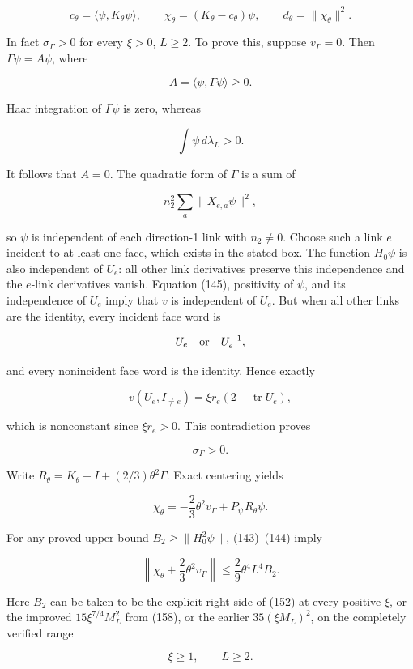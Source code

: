 \documentclass[
  11pt,
]{article}
\begin{document}
\[
 c_\theta=\langle\psi,K_\theta\psi\rangle,\qquad
 \chi_\theta=(K_\theta-c_\theta)\psi,
 \qquad d_\theta=\|\chi_\theta\|^2.
\]

In fact \(\sigma_\Gamma>0\) for every \(\xi>0\), \(L\ge2\). To prove
this, suppose \(v_\Gamma=0\). Then \(\Gamma\psi=A\psi\), where

\[
 A=\langle\psi,\Gamma\psi\rangle\ge0.
\]

Haar integration of \(\Gamma\psi\) is zero, whereas

\[
 \int\psi\,d\lambda_L>0.
\]

It follows that \(A=0\). The quadratic form of \(\Gamma\) is a sum of

\[
 n_2^2\sum_a\|X_{e,a}\psi\|^2,
\]

so \(\psi\) is independent of each direction-1 link with \(n_2\ne0\).
Choose such a link \(e\) incident to at least one face, which exists in
the stated box. The function \(H_0\psi\) is also independent of \(U_e\):
all other link derivatives preserve this independence and the \(e\)-link
derivatives vanish. Equation (145), positivity of \(\psi\), and its
independence of \(U_e\) imply that \(v\) is independent of \(U_e\). But
when all other links are the identity, every incident face word is

\[
 U_e\quad\hbox{or}\quad U_e^{-1},
\]

and every nonincident face word is the identity. Hence exactly

\[
 v(U_e,I_{\ne e})=\xi r_e(2-\operatorname{tr}U_e),
\]

which is nonconstant since \(\xi r_e>0\). This contradiction proves

\[
 \sigma_\Gamma>0.
\tag{159}
\]

Write \(R_\theta=K_\theta-I+(2/3)\theta^2\Gamma\). Exact centering
yields

\[
 \boxed{\chi_\theta=-\frac23\theta^2v_\Gamma
                   +P_\psi^\perp R_\theta\psi.}
\tag{160}
\]

For any proved upper bound \(B_2\ge\|H_0^2\psi\|\), (143)--(144) imply

\[
 \left\|\chi_\theta+\frac23\theta^2v_\Gamma\right\|
 \le\frac29\theta^4L^4B_2.
\tag{161}
\]

Here \(B_2\) can be taken to be the explicit right side of (152) at
every positive \(\xi\), or the improved \(15\xi^{7/4}M_L^2\) from (158),
or the earlier \(35(\xi M_L)^2\), on the completely verified range

\[
 \xi\ge1,\qquad L\ge2.
\]
\end{document}
